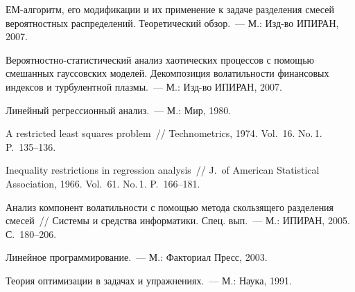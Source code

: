 \begin{multicols}{2}
{{\begin{thebibliography}{99}
ЕМ-алгоритм, его модификации и их
применение к задаче разделения смесей вероятностных распределений.
Теоретический обзор.~--- М.: Изд-во ИПИРАН, 2007.

Вероятностно-статистический анализ
хаотических процессов с помощью смешанных гауссовских моделей.
Декомпозиция волатильности финансовых индексов и турбулентной
плазмы.~--- М.: Изд-во ИПИРАН, 2007.

Линейный регрессионный анализ.~--- М.: Мир, 1980.

A restricted least squares problem~//
Technometrics, 1974. Vol.~16. No.\,1. P.~135--136.

Inequality restrictions in
regression analysis~// J.\ of American Statistical
Association, 1966. Vol.~61. No.\,1. P.~166--181.

Анализ компонент волатильности с помощью метода скользящего
разделения смесей~// Системы и средства информатики. Спец. вып.~---
М.: ИПИРАН, 2005. С.~180--206.

Линейное программирование.~--- М.: Факториал Пресс, 2003.
\label{end\stat}

Теория оптимизации в
задачах и упражнениях.~--- М.:  Наука, 1991.
\end{thebibliography}
}
}
\end{multicols}